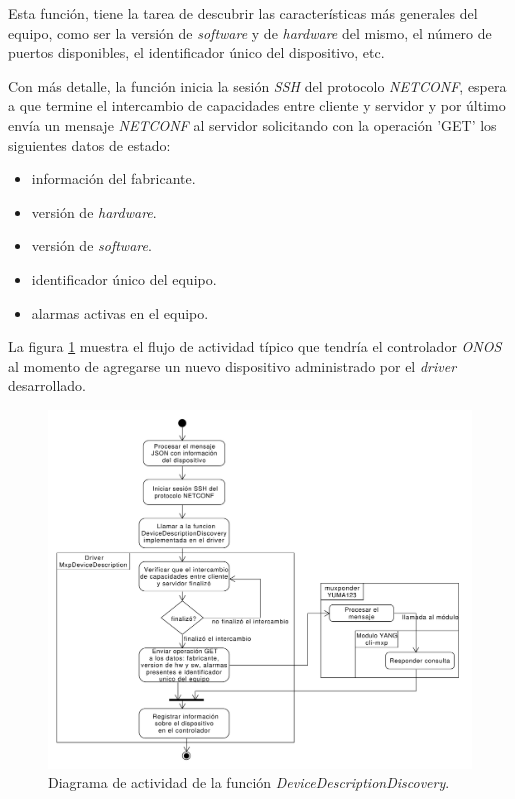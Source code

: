     Esta función, tiene la tarea de descubrir las características más generales del equipo, como ser la versión de \textit{software} y de \textit{hardware} del mismo, el número de puertos disponibles, el identificador único del dispositivo, etc.

    Con más detalle, la función inicia la sesión \textit{SSH} del protocolo \textit{NETCONF}, espera a que termine el intercambio de capacidades entre cliente y servidor y por último envía un mensaje \textit{NETCONF} al servidor solicitando con la operación 'GET' los siguientes datos de estado:  
    
    \begin{itemize}
        \item información del fabricante.
        \item versión de \textit{hardware}.
        \item versión de \textit{software}.
        \item identificador único del equipo.
        \item alarmas activas en el equipo.
    \end{itemize}


    La figura \ref{fig:actividad_driver_descr} muestra el flujo de actividad típico que tendría el controlador \textit{ONOS} al momento de agregarse un nuevo dispositivo administrado por el \textit{driver} desarrollado.
    
    \begin{figure}[H]
        \centering
        \includegraphics[scale=0.45]{Figures/actividad_driver_descr.pdf}
        \caption{Diagrama de actividad de la función \textit{DeviceDescriptionDiscovery}.}
        \label{fig:actividad_driver_descr}
      \end{figure}


